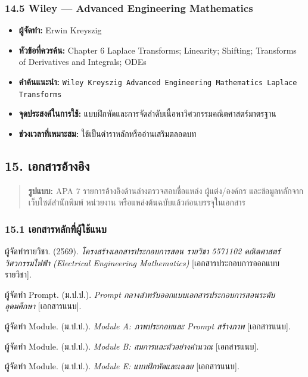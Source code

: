\subsubsection{14.5 Wiley — Advanced Engineering Mathematics}

\begin{itemize}
    \item \textbf{ผู้จัดทำ:} Erwin Kreyszig
    \item \textbf{หัวข้อที่ควรค้น:} Chapter 6 Laplace Transforms; Linearity; Shifting; Transforms of Derivatives and Integrals; ODEs
    \item \textbf{คำค้นแนะนำ:} \texttt{Wiley Kreyszig Advanced Engineering Mathematics Laplace Transforms}
    \item \textbf{จุดประสงค์ในการใช้:} แบบฝึกหัดและการจัดลำดับเนื้อหาวิศวกรรมคณิตศาสตร์มาตรฐาน
    \item \textbf{ช่วงเวลาที่เหมาะสม:} ใช้เป็นตำราหลักหรืออ่านเสริมตลอดบท
\end{itemize}

\newpage

\subsection{15. เอกสารอ้างอิง}

\begin{quote}
\textbf{รูปแบบ:} APA 7
รายการอ้างอิงด้านล่างตรวจสอบชื่อแหล่ง ผู้แต่ง/องค์กร และข้อมูลหลักจากเว็บไซต์สำนักพิมพ์ หน่วยงาน หรือแหล่งต้นฉบับแล้วก่อนบรรจุในเอกสาร
\end{quote}

\subsubsection{15.1 เอกสารหลักที่ผู้ใช้แนบ}

ผู้จัดทำรายวิชา. (2569). \textit{โครงสร้างเอกสารประกอบการสอน รายวิชา 5571102 คณิตศาสตร์วิศวกรรมไฟฟ้า (Electrical Engineering Mathematics)} [เอกสารประกอบการออกแบบรายวิชา].

ผู้จัดทำ Prompt. (ม.ป.ป.). \textit{Prompt กลางสำหรับออกแบบเอกสารประกอบการสอนระดับอุดมศึกษา} [เอกสารแนบ].

ผู้จัดทำ Module. (ม.ป.ป.). \textit{Module A: ภาพประกอบและ Prompt สร้างภาพ} [เอกสารแนบ].

ผู้จัดทำ Module. (ม.ป.ป.). \textit{Module B: สมการและตัวอย่างคำนวณ} [เอกสารแนบ].

ผู้จัดทำ Module. (ม.ป.ป.). \textit{Module E: แบบฝึกหัดและเฉลย} [เอกสารแนบ].

